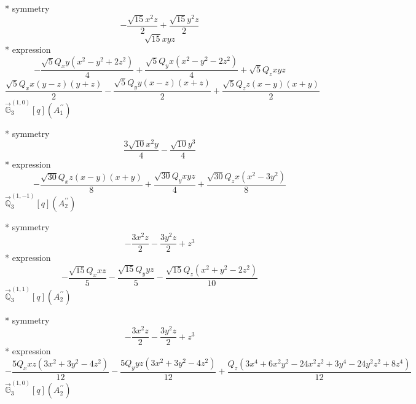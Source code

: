 \documentclass[fleqn,8pt]{jsarticle}
\begin{document}
\noindent\quad ** symmetry
\begin{dmath*}
- \frac{\sqrt{15} x^{2} z}{2} + \frac{\sqrt{15} y^{2} z}{2}
\end{dmath*}
\begin{dmath*}
\sqrt{15} x y z
\end{dmath*}
\noindent\quad ** expression
\begin{dmath*}
- \frac{\sqrt{5} Q_{x} y \left(x^{2} - y^{2} + 2 z^{2}\right)}{4} + \frac{\sqrt{5} Q_{y} x \left(x^{2} - y^{2} - 2 z^{2}\right)}{4} + \sqrt{5} Q_{z} x y z
\end{dmath*}
\begin{dmath*}
\frac{\sqrt{5} Q_{x} x \left(y - z\right) \left(y + z\right)}{2} - \frac{\sqrt{5} Q_{y} y \left(x - z\right) \left(x + z\right)}{2} + \frac{\sqrt{5} Q_{z} z \left(x - y\right) \left(x + y\right)}{2}
\end{dmath*}
\noindent\quad $\vec{\mathbb{G}}_{3}^{(1,0)}[q](A_{1}^{\prime\prime})$

\noindent\quad ** symmetry
\begin{dmath*}
\frac{3 \sqrt{10} x^{2} y}{4} - \frac{\sqrt{10} y^{3}}{4}
\end{dmath*}
\noindent\quad ** expression
\begin{dmath*}
- \frac{\sqrt{30} Q_{x} z \left(x - y\right) \left(x + y\right)}{8} + \frac{\sqrt{30} Q_{y} x y z}{4} + \frac{\sqrt{30} Q_{z} x \left(x^{2} - 3 y^{2}\right)}{8}
\end{dmath*}
\noindent\quad $\vec{\mathbb{Q}}_{3}^{(1,-1)}[q](A_{2}^{\prime\prime})$

\noindent\quad ** symmetry
\begin{dmath*}
- \frac{3 x^{2} z}{2} - \frac{3 y^{2} z}{2} + z^{3}
\end{dmath*}
\noindent\quad ** expression
\begin{dmath*}
- \frac{\sqrt{15} Q_{x} x z}{5} - \frac{\sqrt{15} Q_{y} y z}{5} - \frac{\sqrt{15} Q_{z} \left(x^{2} + y^{2} - 2 z^{2}\right)}{10}
\end{dmath*}
\noindent\quad $\vec{\mathbb{Q}}_{3}^{(1,1)}[q](A_{2}^{\prime\prime})$

\noindent\quad ** symmetry
\begin{dmath*}
- \frac{3 x^{2} z}{2} - \frac{3 y^{2} z}{2} + z^{3}
\end{dmath*}
\noindent\quad ** expression
\begin{dmath*}
- \frac{5 Q_{x} x z \left(3 x^{2} + 3 y^{2} - 4 z^{2}\right)}{12} - \frac{5 Q_{y} y z \left(3 x^{2} + 3 y^{2} - 4 z^{2}\right)}{12} + \frac{Q_{z} \left(3 x^{4} + 6 x^{2} y^{2} - 24 x^{2} z^{2} + 3 y^{4} - 24 y^{2} z^{2} + 8 z^{4}\right)}{12}
\end{dmath*}
\noindent\quad $\vec{\mathbb{G}}_{3}^{(1,0)}[q](A_{2}^{\prime\prime})$
\end{document}
